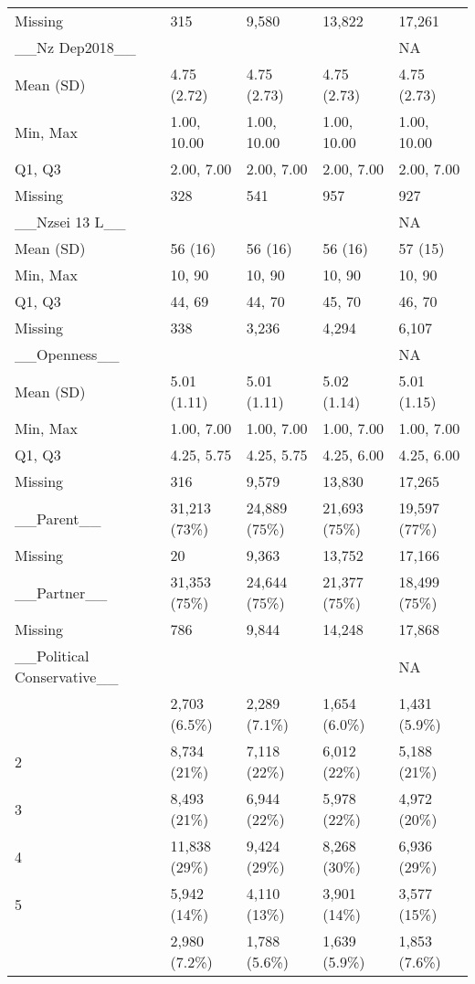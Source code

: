 \documentclass[
  single column]{article}
\begin{document}
\begin{longtable}[t]{lllll}
Missing & 315 & 9,580 & 13,822 & 17,261\\
\addlinespace
\_\_Nz Dep2018\_\_ &   ~~&   ~~&   ~~& NA\\
Mean (SD) & 4.75 (2.72) & 4.75 (2.73) & 4.75 (2.73) & 4.75 (2.73)\\
Min, Max & 1.00, 10.00 & 1.00, 10.00 & 1.00, 10.00 & 1.00, 10.00\\
Q1, Q3 & 2.00, 7.00 & 2.00, 7.00 & 2.00, 7.00 & 2.00, 7.00\\
Missing & 328 & 541 & 957 & 927\\
\addlinespace
\_\_Nzsei 13 L\_\_ &   ~~&   ~~&   ~~& NA\\
Mean (SD) & 56 (16) & 56 (16) & 56 (16) & 57 (15)\\
Min, Max & 10, 90 & 10, 90 & 10, 90 & 10, 90\\
Q1, Q3 & 44, 69 & 44, 70 & 45, 70 & 46, 70\\
Missing & 338 & 3,236 & 4,294 & 6,107\\
\addlinespace
\_\_Openness\_\_ &   ~~&   ~~&   ~~& NA\\
Mean (SD) & 5.01 (1.11) & 5.01 (1.11) & 5.02 (1.14) & 5.01 (1.15)\\
Min, Max & 1.00, 7.00 & 1.00, 7.00 & 1.00, 7.00 & 1.00, 7.00\\
Q1, Q3 & 4.25, 5.75 & 4.25, 5.75 & 4.25, 6.00 & 4.25, 6.00\\
Missing & 316 & 9,579 & 13,830 & 17,265\\
\addlinespace
\_\_Parent\_\_ & 31,213 (73\%) & 24,889 (75\%) & 21,693 (75\%) & 19,597 (77\%)\\
Missing & 20 & 9,363 & 13,752 & 17,166\\
\_\_Partner\_\_ & 31,353 (75\%) & 24,644 (75\%) & 21,377 (75\%) & 18,499 (75\%)\\
Missing & 786 & 9,844 & 14,248 & 17,868\\
\_\_Political Conservative\_\_ &   ~~&   ~~&   ~~& NA\\
\addlinespace
1 & 2,703 (6.5\%) & 2,289 (7.1\%) & 1,654 (6.0\%) & 1,431 (5.9\%)\\
2 & 8,734 (21\%) & 7,118 (22\%) & 6,012 (22\%) & 5,188 (21\%)\\
3 & 8,493 (21\%) & 6,944 (22\%) & 5,978 (22\%) & 4,972 (20\%)\\
4 & 11,838 (29\%) & 9,424 (29\%) & 8,268 (30\%) & 6,936 (29\%)\\
5 & 5,942 (14\%) & 4,110 (13\%) & 3,901 (14\%) & 3,577 (15\%)\\
\addlinespace
6 & 2,980 (7.2\%) & 1,788 (5.6\%) & 1,639 (5.9\%) & 1,853 (7.6\%)\\

\end{longtable}
\end{document}
